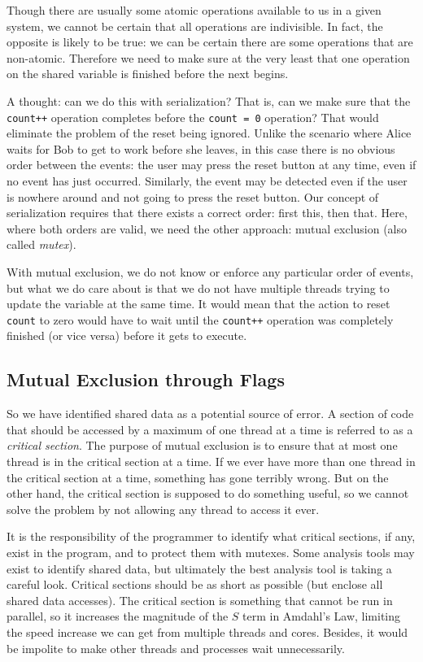 Though there are usually some atomic operations available to us in a given system, we cannot be certain that all operations are indivisible. In fact, the opposite is likely to be true: we can be certain there are some operations that are non-atomic. Therefore we need to make sure at the very least that one operation on the shared variable is finished before the next begins.

A thought: can we do this with serialization? That is, can we make sure that the \texttt{count++} operation completes before the \texttt{count = 0} operation? That would eliminate the problem of the reset being ignored. Unlike the scenario where Alice waits for Bob to get to work before she leaves, in this case there is no obvious order between the events: the user may press the reset button at any time, even if no event has just occurred. Similarly, the event may be detected even if the user is nowhere around and not going to press the reset button. Our concept of serialization requires that there exists a correct order: first this, then that. Here, where both orders are valid, we need the other approach: mutual exclusion (also called \textit{mutex}).

With mutual exclusion, we do not know or enforce any particular order of events, but what we do care about is that we do not have multiple threads trying to update the variable at the same time. It would mean that the action to reset \texttt{count} to zero would have to wait until the \texttt{count++} operation was completely finished (or vice versa) before it gets to execute.

\subsection*{Mutual Exclusion through Flags}
So we have identified shared data as a potential source of error. A section of code that should be accessed by a maximum of one thread at a time is referred to as a \textit{critical section}. The purpose of mutual exclusion is to ensure that at most one thread is in the critical section at a time. If we ever have more than one thread in the critical section at a time, something has gone terribly wrong. But on the other hand, the critical section is supposed to do something useful, so we cannot solve the problem by not allowing any thread to access it ever.

It is the responsibility of the programmer to identify what critical sections, if any, exist in the program, and to protect them with mutexes. Some analysis tools may exist to identify shared data, but ultimately the best analysis tool is taking a careful look. Critical sections should be as short as possible (but enclose all shared data accesses). The critical section is something that cannot be run in parallel, so it increases the magnitude of the $S$ term in Amdahl's Law, limiting the speed increase we can get from multiple threads and cores. Besides, it would be impolite to make other threads and processes wait unnecessarily.


